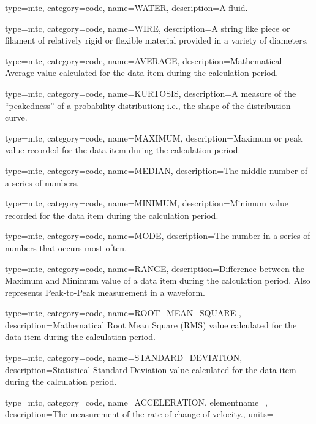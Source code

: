 {
  type=mtc,
  category=code,
  name={WATER},
  description={A fluid.}
}

{
  type=mtc,
  category=code,
  name={WIRE},
  description={A string like piece or filament of relatively rigid or flexible material provided in a variety of diameters.}
}

{
  type=mtc,
  category=code,
  name={AVERAGE},
  description={Mathematical Average value calculated for the data item during the calculation period.}
}

{
  type=mtc,
  category=code,
  name={KURTOSIS},
  description={A measure of the “peakedness” of a probability distribution; i.e., the shape of the distribution curve.}
}

{
  type=mtc,
  category=code,
  name={MAXIMUM},
  description={Maximum or peak value recorded for the data item during the calculation period.}
}

{
  type=mtc,
  category=code,
  name={MEDIAN},
  description={The middle number of a series of numbers.}
}

{
  type=mtc,
  category=code,
  name={MINIMUM},
  description={Minimum value recorded for the data item during the calculation period.}
}

{
  type=mtc,
  category=code,
  name={MODE},
  description={The number in a series of numbers that occurs most often.}
}

{
  type=mtc,
  category=code,
  name={RANGE},
  description={Difference between the Maximum and Minimum value of a data item during the calculation period.  Also represents Peak-to-Peak measurement in a waveform.}
}

{
  type=mtc,
  category=code,
  name={ROOT\_MEAN\_SQUARE },
  description={Mathematical Root Mean Square (RMS) value calculated for the data item during the calculation period.}
}

{
  type=mtc,
  category=code,
  name={STANDARD\_DEVIATION},
  description={Statistical Standard Deviation value calculated for the data item during the calculation period.}
}


{
  type=mtc,
  category=code,
  name={ACCELERATION},
  elementname=,
  description={The measurement of the rate of change of velocity.},
  units=
}

